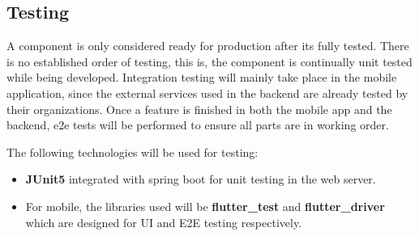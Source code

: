 \subsection{Testing}
A component is only considered ready for production after its fully tested. There is no established order of testing, this is, the component is continually unit tested while being developed. 
Integration testing will mainly take place in the mobile application, since the external services used in the backend are already tested by their organizations. 
Once a feature is finished in both the mobile app and the backend, e2e tests will be performed to ensure all parts are in working order.

The following technologies will be used for testing:
\begin{itemize}
    \item 
    \textbf{JUnit5} integrated with spring boot for unit testing in the web server.
    \item 
    For mobile, the libraries used will be \textbf{flutter\_test} and \textbf{flutter\_driver} which are designed for UI and E2E testing respectively.
\end{itemize}
